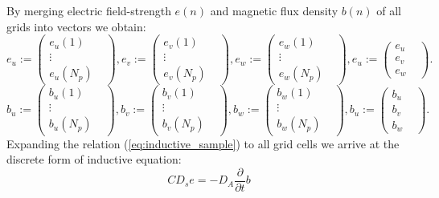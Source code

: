 By merging electric field-strength $e(n)$ and magnetic flux density $b(n)$ of all grids into vectors we obtain:
\begin{equation}
e_{u}:=
\begin{pmatrix}
e_{u}(1)&\\
\vdots&\\
e_{u}(N_{p})&
\end{pmatrix},
e_{v}:=
\begin{pmatrix}
e_{v}(1)&\\
\vdots&\\
e_{v}(N_{p})&
\end{pmatrix},
e_{w}:=
\begin{pmatrix}
e_{w}(1)&\\
\vdots&\\
e_{w}(N_{p})&
\end{pmatrix},
e_{u}:=
\begin{pmatrix}
e_{u}&\\
e_{v}&\\
e_{w}&
\end{pmatrix}.
\label{eq:vector_e_field}
\end{equation}
\begin{equation}
b_{u}:=
\begin{pmatrix}
b_{u}(1)&\\
\vdots&\\
b_{u}(N_{p})&
\end{pmatrix},
b_{v}:=
\begin{pmatrix}
b_{v}(1)&\\
\vdots&\\
b_{v}(N_{p})&
\end{pmatrix},
b_{w}:=
\begin{pmatrix}
b_{w}(1)&\\
\vdots&\\
b_{w}(N_{p})&
\end{pmatrix},
b_{u}:=
\begin{pmatrix}
b_{u}&\\
b_{v}&\\
b_{w}&
\end{pmatrix}.
\label{eq:vector_m_flux_density}
\end{equation}
Expanding the relation (\ref{eq:inductive_sample}) to all grid cells \cite{FIT_discrete_method}\cite{FIT_discrete_electrommagnetism}\cite{FIT_triangular_discretization}\cite{script_FeldSim} we arrive at the discrete form of inductive equation:
\begin{equation}
CD_{s}e=-D_{A}\frac{\partial}{\partial{t}}b
\label{eq:inductive_sample_all}
\end{equation}

